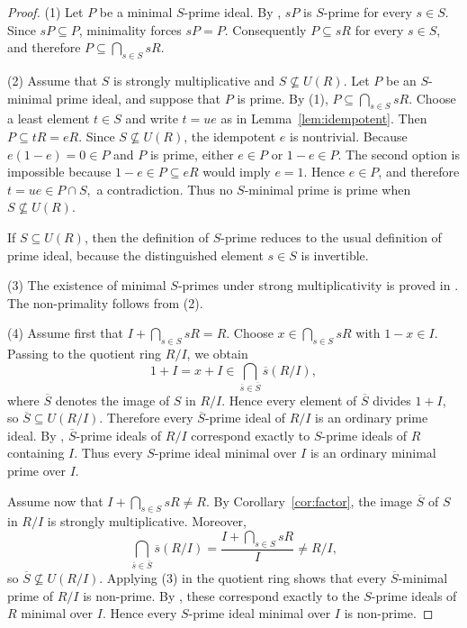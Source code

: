 \documentclass[11pt]{amsart}
\theoremstyle{definition}
\theoremstyle{remark}
\begin{document}
\begin{proof}
(1) Let $P$ be a minimal $S$-prime ideal.
By \cite[Proposition~2]{Hamed}, $sP$ is $S$-prime for every $s \in S$.
Since $sP \subseteq P$, minimality forces $sP=P$.
Consequently $P \subseteq sR$ for every $s \in S$, and therefore
$P \subseteq \bigcap_{s \in S} sR.$

(2) Assume that $S$ is strongly multiplicative and $S \nsubseteq U(R)$.
Let $P$ be an $S$-minimal prime ideal, and suppose that $P$ is prime.
By (1), $P \subseteq \bigcap_{s \in S} sR.$
Choose a least element $t \in S$ and write $t=ue$ as in Lemma~\ref{lem:idempotent}.
Then $P \subseteq tR=eR.$
Since $S \nsubseteq U(R)$, the idempotent $e$ is nontrivial.
Because $e(1-e)=0 \in P$ and $P$ is prime, either $e \in P$ or $1-e \in P$.
The second option is impossible because $1-e \in P \subseteq eR$ would imply $e=1$.
Hence $e \in P$, and therefore $t=ue \in P \cap S,$ a contradiction.
Thus no $S$-minimal prime is prime when $S \nsubseteq U(R)$.

If $S \subseteq U(R)$, then the definition of $S$-prime reduces to the usual definition of prime ideal, because the distinguished element $s \in S$ is invertible.

(3) The existence of minimal $S$-primes under strong multiplicativity is proved in \cite[Proposition~5]{Hamed}.
The non-primality follows from (2).

(4) Assume first that $I+\bigcap_{s \in S} sR=R.$
Choose $x \in \bigcap_{s \in S} sR$ with $1-x \in I$.
Passing to the quotient ring $R/I$, we obtain
\[
1+I=x+I \in \bigcap_{\overline s \in \overline S}\overline s(R/I),
\]
where $\overline S$ denotes the image of $S$ in $R/I$.
Hence every element of $\overline S$ divides $1+I$, so $\overline S \subseteq U(R/I)$.
Therefore every $\overline S$-prime ideal of $R/I$ is an ordinary prime ideal.
By \cite[Proposition~3]{Hamed}, $\overline S$-prime ideals of $R/I$ correspond exactly to $S$-prime ideals of $R$ containing $I$.
Thus every $S$-prime ideal minimal over $I$ is an ordinary minimal prime over $I$.

Assume now that $I+\bigcap_{s \in S} sR \neq R.$
By Corollary~\ref{cor:factor}, the image $\overline S$ of $S$ in $R/I$ is strongly multiplicative.
Moreover,
\[
\bigcap_{\overline s \in \overline S}\overline s(R/I)
=
\frac{I+\bigcap_{s \in S}sR}{I}
\neq R/I,
\]
so $\overline S \nsubseteq U(R/I)$.
Applying (3) in the quotient ring shows that every $\overline S$-minimal prime of $R/I$ is non-prime.
By \cite[Proposition~3]{Hamed}, these correspond exactly to the $S$-prime ideals of $R$ minimal over $I$.
Hence every $S$-prime ideal minimal over $I$ is non-prime.
\end{proof}
\end{document}
